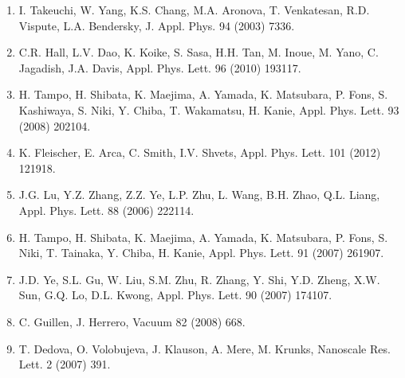 \documentclass[14pt]{article}
\begin{document}
\begin{enumerate}
		\item  I. Takeuchi, W. Yang, K.S. Chang, M.A. Aronova, T. Venkatesan, R.D. Vispute, L.A. Bendersky, J. Appl. Phys. 94 (2003) 7336.
		\item  C.R. Hall, L.V. Dao, K. Koike, S. Sasa, H.H. Tan, M. Inoue, M. Yano, C. Jagadish, J.A. Davis, Appl. Phys. Lett. 96 (2010) 193117.
		\item  H. Tampo, H. Shibata, K. Maejima, A. Yamada, K. Matsubara, P. Fons, S. Kashiwaya, S. Niki, Y. Chiba, T. Wakamatsu, H. Kanie,
		Appl. Phys. Lett. 93 (2008) 202104.
		\item  K. Fleischer, E. Arca, C. Smith, I.V. Shvets, Appl. Phys. Lett. 101 (2012) 121918.
		\item  J.G. Lu, Y.Z. Zhang, Z.Z. Ye, L.P. Zhu, L. Wang, B.H. Zhao, Q.L. Liang, Appl. Phys. Lett. 88 (2006) 222114.
		\item  H. Tampo, H. Shibata, K. Maejima, A. Yamada, K. Matsubara, P. Fons, S. Niki, T. Tainaka, Y. Chiba, H. Kanie, Appl. Phys. Lett.
		91 (2007) 261907.
		\item  J.D. Ye, S.L. Gu, W. Liu, S.M. Zhu, R. Zhang, Y. Shi, Y.D. Zheng, X.W. Sun, G.Q. Lo, D.L. Kwong, Appl. Phys. Lett. 90 (2007)
		174107.
		\item  C. Guillen, J. Herrero, Vacuum 82 (2008) 668.
		\item  T. Dedova, O. Volobujeva, J. Klauson, A. Mere, M. Krunks, Nanoscale Res. Lett. 2 (2007) 391.
		
	\end{enumerate}
	
	
	
	
	
	
	
	
	
	
	
	
	
	
	
	
	
	
	
	
	
	
	
	
\end{document}
